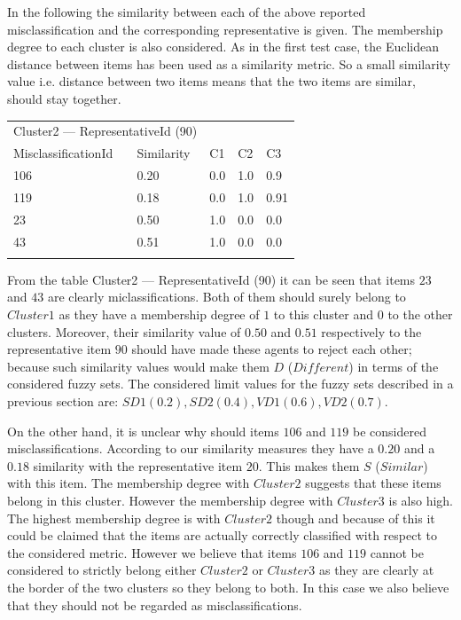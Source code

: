 In the following the similarity between each of the above reported misclassification and the corresponding representative is given. The membership degree to each cluster is also considered. As in the first test case, the Euclidean distance between items has been used as a similarity metric. So a small similarity value i.e. distance between two items means that the two items are similar, should stay together.\\

\begin{tabular}{lllll}
\hline
\multicolumn{2}{c}{Cluster2 --- RepresentativeId (90)} \\
\cline{1-5}
MisclassificationId & Similarity  & C1 & C2 & C3\\ 
\hline
106 & 0.20 & 0.0 & 1.0 & 0.9\\
119 & 0.18 & 0.0  &  1.0 &   0.91\\
23 & 0.50 & 1.0 &   0.0 &   0.0\\
43 & 0.51 & 1.0 &   0.0 &   0.0\\
\hline \\
\end{tabular} 


From the table Cluster2 --- RepresentativeId (90) it can be seen  that items $23$ and $43$ are clearly miclassifications. Both of them should surely belong to $Cluster1$ as they have a membership degree of $1$ to this cluster and $0$ to the other clusters. Moreover, their similarity value of $0.50$ and $0.51$ respectively to the representative item $90$ should have made these agents to reject each other; because such similarity values would  make them $D$ ($Different$) in terms of the considered fuzzy  sets. The considered limit values for the fuzzy sets described in a previous section are: $SD1(0.2), SD2(0.4), VD1(0.6), VD2(0.7)$.

On the other hand, it is unclear why should items $106$ and $119$ be considered misclassifications. According to our similarity measures they have a $0.20$ and a $0.18$ similarity with the representative item $20$. This makes them $S$ ($Similar$) with this item. The membership degree with $Cluster2$ suggests that these items belong in this cluster. However the membership degree with $Cluster3$ is also high. The highest membership degree is with $Cluster2$ though and because of this it could be claimed that the items are actually correctly classified with respect to the considered metric. However we believe that items $106$ and $119$ cannot be considered to strictly belong either $Cluster2$ or $Cluster3$ as they are clearly at the border of the two clusters so they belong to both. In this case we also believe that they should not be regarded as misclassifications. \\

